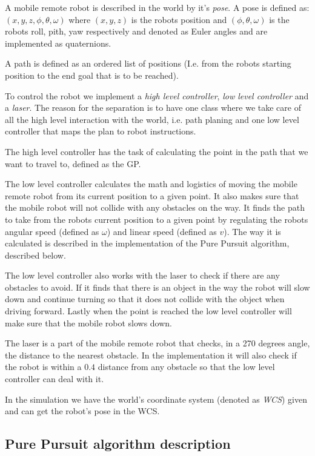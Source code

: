 \documentclass[12pt]{article}
\begin{document}
A mobile remote robot is described in the world by it's \textit{pose}. A pose is
defined as: $(x, y, z, \phi, \theta, \omega)$ where $(x,y,z)$ is the robots
position and $(\phi, \theta, \omega)$ is the robots roll, pith, yaw respectively
and denoted as Euler angles and are implemented as quaternions.

A path is defined as an ordered list of positions (I.e. from the robots starting
position to the end goal that is to be reached).

To control the robot we implement a \textit{high level controller}, 
\textit{low level controller} and a \textit{laser}. The reason for the separation is to have one class
where we take care of all the high level interaction with the world, i.e. path planing and one low
level controller that maps the plan to robot instructions.

The high level controller has the task of calculating the point in the path that
we want to travel to, defined as the GP. 

The low level controller calculates the math and logistics of moving the mobile
remote robot from its current position to a given point. It also makes sure
that the mobile robot will not collide with any obstacles on the way. It finds the
path to take from the robots current position to a given point by regulating the
robots angular speed (defined as $\omega$) and linear speed (defined as $v$).
The way it is calculated is described in the implementation of the Pure
Pursuit algorithm, described below.

The low level controller also works with the laser to check if there are any
obstacles to avoid. If it finds that there is an object in the way the
robot will slow down and continue turning so that it does not collide with the
object when driving forward. Lastly when the point is reached the low level
controller will make sure that the mobile robot slows down.  

The laser is a part of the mobile remote robot that checks, in a 270 degrees angle,
the distance to the nearest obstacle. In the implementation it will also check
if the robot is within a $0.4$ distance from any obstacle so that the low level
controller can deal with it.

In the simulation we have the world's coordinate system (denoted as
\textit{WCS}) given and can get the robot's pose in the WCS. 

\subsection{Pure Pursuit algorithm description}
\end{document}
